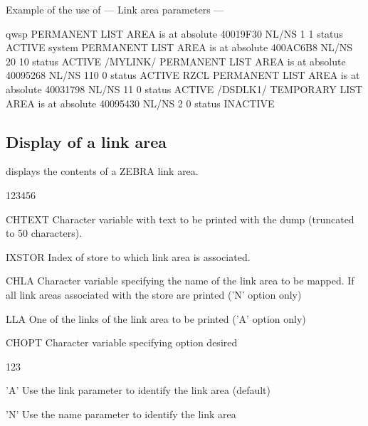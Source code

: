 \begin{landscapebody}
\begin{XMPt}{Example of the use of }
 --- Link area parameters ---                                                                                                    
                                                                                                                                 
qwsp     PERMANENT LIST AREA      is at absolute 40019F30 NL/NS     1    1     status   ACTIVE                                   
system   PERMANENT LIST AREA      is at absolute 400AC6B8 NL/NS    20   10     status   ACTIVE                                   
/MYLINK/ PERMANENT LIST AREA      is at absolute 40095268 NL/NS   110    0     status   ACTIVE                                   
RZCL     PERMANENT LIST AREA      is at absolute 40031798 NL/NS    11    0     status   ACTIVE                                   
/DSDLK1/ TEMPORARY LIST AREA      is at absolute 40095430 NL/NS     2    0     status INACTIVE                                   
\end{XMPt}
\end{landscapebody}

\newpage
\subsection{Display of a link area}


\Action {} displays the contents of a ZEBRA link area.

\begin{DLtt}{123456}
\item[CHTEXT]Character variable with text to be printed with the
dump (truncated to 50 characters).
\item[IXSTOR]Index of store to which link area is associated.
\item[CHLA]Character variable specifying the name of the link area to be mapped.
\newline If  all link areas associated with the store are printed
('N' option only)
\item[LLA]One of the links of the link area to be printed ('A' option only)
\item[CHOPT]Character variable specifying option desired
\begin{DLtt}{123}
\item['A']Use the link parameter  to identify the link area (default)
\item['N']Use the name parameter  to identify the link area
\end{DLtt}
\end{DLtt}

